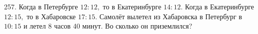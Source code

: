 257. Когда в Петербурге $12:12,$ то в Екатеринбурге $14:12.$ Когда в Екатеринбурге $12:15,$ то в Хабаровске $17:15.$ Самолёт вылетел из Хабаровска в Петербург в $10:15$ и летел 8 часов 40 минут. Во сколько он приземлился?\\
